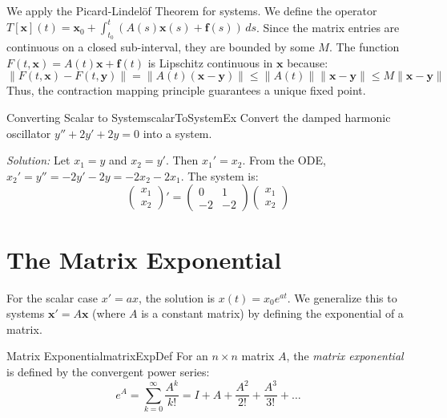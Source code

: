 \documentclass{book}
\newenvironment{Proof}[1][]
  {\begin{ProofTcb}[#1]}
  {\end{ProofTcb}}
\begin{document}
\begin{Proof}
    We apply the Picard-Lindelöf Theorem for systems. We define the operator $T[\mathbf{x}](t) = \mathbf{x}_0 + \int_{t_0}^t (A(s)\mathbf{x}(s) + \mathbf{f}(s)) \, ds$.
    Since the matrix entries are continuous on a closed sub-interval, they are bounded by some $M$. The function $F(t, \mathbf{x}) = A(t)\mathbf{x} + \mathbf{f}(t)$ is Lipschitz continuous in $\mathbf{x}$ because:
    \[
        \| F(t, \mathbf{x}) - F(t, \mathbf{y}) \| = \| A(t)(\mathbf{x} - \mathbf{y}) \| \le \|A(t)\| \|\mathbf{x} - \mathbf{y}\| \le M \|\mathbf{x} - \mathbf{y}\|
    \]
    Thus, the contraction mapping principle guarantees a unique fixed point.
\end{Proof}

\begin{example}{Converting Scalar to System}{scalarToSystemEx}
    Convert the damped harmonic oscillator $y'' + 2y' + 2y = 0$ into a system.

    \emph{Solution:} Let $x_1 = y$ and $x_2 = y'$.
    Then $x_1' = x_2$.
    From the ODE, $x_2' = y'' = -2y' - 2y = -2x_2 - 2x_1$.
    The system is:
    \[
        \begin{pmatrix} x_1 \\ x_2 \end{pmatrix}' = \begin{pmatrix} 0 & 1 \\ -2 & -2 \end{pmatrix} \begin{pmatrix} x_1 \\ x_2 \end{pmatrix}
    \]
\end{example}

\section{The Matrix Exponential}

For the scalar case $x' = ax$, the solution is $x(t) = x_0 e^{at}$. We generalize this to systems $\mathbf{x}' = A\mathbf{x}$ (where $A$ is a constant matrix) by defining the exponential of a matrix.

\begin{defn}{Matrix Exponential}{matrixExpDef}
    For an $n \times n$ matrix $A$, the \emph{matrix exponential} is defined by the convergent power series:
    \[
        e^{A} = \sum_{k=0}^\infty \frac{A^k}{k!} = I + A + \frac{A^2}{2!} + \frac{A^3}{3!} + \dots
    \]
\end{defn}
\end{document}
